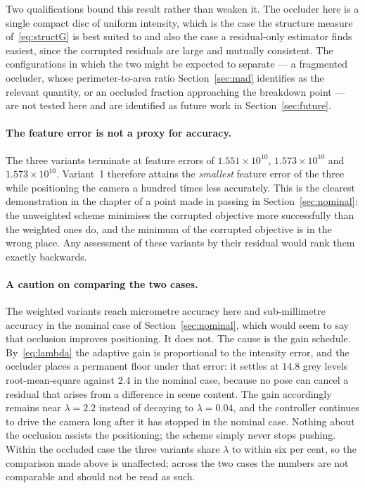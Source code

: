 Two qualifications bound this result rather than weaken it. The occluder here
is a single compact disc of uniform intensity, which is the case the structure
measure of~\eqref{eq:structG} is best suited to and also the case a
residual-only estimator finds easiest, since the corrupted residuals are large
and mutually consistent. The configurations in which the two might be expected
to separate --- a fragmented occluder, whose perimeter-to-area ratio
Section~\ref{sec:mad} identifies as the relevant quantity, or an occluded
fraction approaching the breakdown point --- are not tested here and are
identified as future work in Section~\ref{sec:future}.

\paragraph{The feature error is not a proxy for accuracy.}
The three variants terminate at feature errors of $1.551\times10^{10}$,
$1.573\times10^{10}$ and $1.573\times10^{10}$. Variant~1 therefore attains the
\emph{smallest} feature error of the three while positioning the camera a
hundred times less accurately. This is the clearest demonstration in the
chapter of a point made in passing in Section~\ref{sec:nominal}: the
unweighted scheme minimises the corrupted objective more successfully than the
weighted ones do, and the minimum of the corrupted objective is in the wrong
place. Any assessment of these variants by their residual would rank them
exactly backwards.

\paragraph{A caution on comparing the two cases.}
The weighted variants reach micrometre accuracy here and sub-millimetre
accuracy in the nominal case of Section~\ref{sec:nominal}, which would seem to
say that occlusion improves positioning. It does not. The cause is the gain
schedule. By~\eqref{eq:lambda} the adaptive gain is proportional to the
intensity error, and the occluder places a permanent floor under that error:
it settles at $14.8$ grey levels root-mean-square against $2.4$ in the nominal
case, because no pose can cancel a residual that arises from a difference in
scene content. The gain accordingly remains near $\lambda=2.2$ instead of
decaying to $\lambda=0.04$, and the controller continues to drive the camera
long after it has stopped in the nominal case. Nothing about the occlusion
assists the positioning; the scheme simply never stops pushing. Within the
occluded case the three variants share $\lambda$ to within six per cent, so
the comparison made above is unaffected; across the two cases the numbers are
not comparable and should not be read as such.

